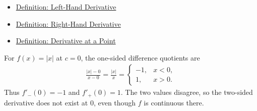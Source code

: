 \begin{dependencies}
\begin{itemize}
  \item \hyperref[def:left-hand-derivative]{Definition: Left-Hand Derivative}
  \item \hyperref[def:right-hand-derivative]{Definition: Right-Hand Derivative}
  \item \hyperref[def:derivative-at-a-point]{Definition: Derivative at a Point}
\end{itemize}
\end{dependencies}

\begin{exposition}
\label{ex:abs-corner}
For \(f(x)=|x|\) at \(c=0\), the one-sided difference quotients are
\[
\begin{aligned}
  \frac{|x|-0}{x-0}
  =
  \frac{|x|}{x}
  =
  \begin{cases}
    -1, & x<0,\\
    1, & x>0.
  \end{cases}
\end{aligned}
\]
Thus \(f'_-(0)=-1\) and \(f'_+(0)=1\). The two values disagree, so the
two-sided derivative does not exist at \(0\), even though \(f\) is continuous
there.
\end{exposition}
